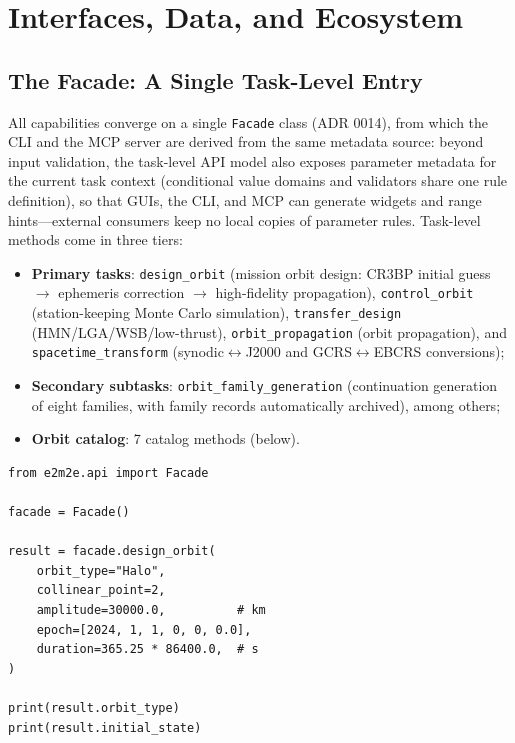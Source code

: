 \section{Interfaces, Data, and Ecosystem}
\label{sec:interfaces}

\subsection{The Facade: A Single Task-Level Entry}

All capabilities converge on a single \texttt{Facade} class (ADR 0014), from
which the CLI and the MCP server are derived from the same metadata source:
beyond input validation, the task-level API model also exposes parameter
metadata for the current task context (conditional value domains and
validators share one rule definition), so that GUIs, the CLI, and MCP can
generate widgets and range hints---external consumers keep no local copies of
parameter rules. Task-level methods come in three tiers:

\begin{itemize}
  \item \textbf{Primary tasks}: \texttt{design\_orbit} (mission orbit design:
        CR3BP initial guess $\to$ ephemeris correction $\to$ high-fidelity
        propagation), \texttt{control\_orbit} (station-keeping Monte Carlo
        simulation), \texttt{transfer\_design} (HMN/LGA/WSB/low-thrust),
        \texttt{orbit\_propagation} (orbit propagation), and
        \texttt{spacetime\_transform} (synodic$\leftrightarrow$J2000 and
        GCRS$\leftrightarrow$EBCRS conversions);
  \item \textbf{Secondary subtasks}: \texttt{orbit\_family\_generation}
        (continuation generation of eight families, with family records
        automatically archived), among others;
  \item \textbf{Orbit catalog}: 7 catalog methods (below).
\end{itemize}

\begin{lstlisting}[caption={Designing an Earth--Moon L2 Halo orbit (examples/main\_design.py)},label=lst:quickstart]
from e2m2e.api import Facade

facade = Facade()

result = facade.design_orbit(
    orbit_type="Halo",
    collinear_point=2,
    amplitude=30000.0,          # km
    epoch=[2024, 1, 1, 0, 0, 0.0],
    duration=365.25 * 86400.0,  # s
)

print(result.orbit_type)
print(result.initial_state)
\end{lstlisting}

